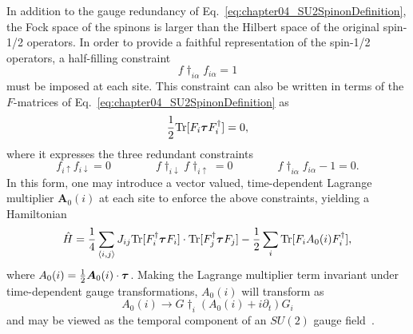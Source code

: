In addition to the gauge redundancy of Eq.~\eqref{eq:chapter04_SU2SpinonDefinition}, the Fock space of the spinons is larger than the Hilbert space of the original spin-1/2 operators.
In order to provide a faithful representation of the spin-1/2 operators, a half-filling constraint
%
\begin{equation}
	f\dag_{i\alpha} f_{i\alpha} = 1
	\label{eq:chapter04_HalfFillingConstraint}
\end{equation}
%
must be imposed at each site.
This constraint can also be written in terms of the $F$-matrices of Eq.~\eqref{eq:chapter04_SU2SpinonDefinition} as
%
\begin{equation}
	\frac{1}{2}\text{Tr}{[F_i \bm{\tau}F\ensuremath{^{\dagger}}_i]} = 0,
\end{equation}
%
where it expresses the three redundant constraints
%
\begin{equation}
	f_{i\uparrow} f_{i\downarrow} = 0 \qquad\qquad
	f\dag_{i\downarrow} f\dag_{i\uparrow} = 0 \qquad\qquad
	f\dag_{i\alpha} f_{i\alpha} - 1 = 0.
	\label{eq:chapter04_HalfFillingConstraintRedundant}
\end{equation}
%
In this form, one may introduce a vector valued, time-dependent Lagrange multiplier $\bm{A}_0(i)$ at each site to enforce the above constraints, yielding a Hamiltonian
%
\begin{equation}
	\hat{H} = \frac{1}{4} \sum_{\langle i,j \rangle} J_{ij} \text{Tr}{[F\ensuremath{^{\dagger}}_i \bm{\tau}F_i]} \cdot \text{Tr}{[F\ensuremath{^{\dagger}}_j \bm{\tau}F_j]} - \frac{1}{2} \sum_i \text{Tr}{[F_i A_0(i) F\ensuremath{^{\dagger}}_i]},
	\label{eq:chapter04_SpinonHamiltonian}
\end{equation}
%
where $A_0(i) = \frac{1}{2}\bm{A}_0(i) \cdot \bm{\tau}$.
Making the Lagrange multiplier term invariant under time-dependent gauge transformations, $A_0(i)$ will transform as
%
\begin{equation}
	A_0(i) \rightarrow G\dag_i (A_0(i) + i\partial_t) G_i
\end{equation}
%
and may be viewed as the temporal component of an $SU(2)$ gauge field~\cite{AffleckPRB1988,DagottoPRB1988}.

